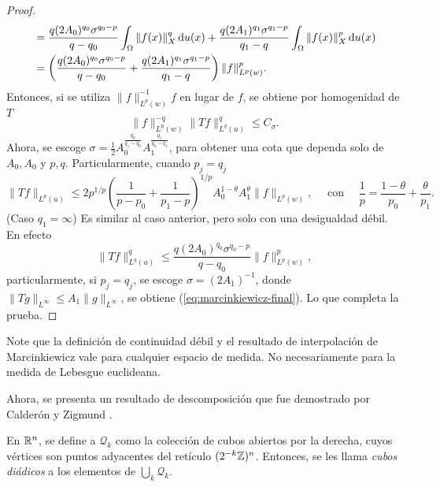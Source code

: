 \begin{proof}
\begin{align*}
		& = \frac{q(2A_0)^{q_0}\sigma^{q_0-p}}{q-q_0} \int_\Omega \|f(x)\|_X^q \mathop{}\!\mathrm{d} u(x) + \frac{q(2A_1)^{q_1}\sigma^{q_1-p}}{q_1-q} \int_\Omega \|f(x)\|_X^p \mathop{}\!\mathrm{d} u(x) \\
		& = \left(\frac{q(2A_0)^{q_0}\sigma^{q_0-p}}{q-q_0} +\frac{q(2A_1)^{q_1}\sigma^{q_1-p}}{q_1-q} \right) \|f\|_{L^p(w)}^p.
	\end{align*}
	Entonces, si se utiliza $\|f\|_{L^p(w)}^{-1} f$ en lugar de $f$, se obtiene por homogenidad de $T$ 
	\begin{equation*}
	\|f\|_{L^p(w)}^{-q}	\|Tf\|_{L^q(u)}^q \leq C_\sigma.
	\end{equation*}
	Ahora, se escoge $\sigma=\frac{1}{2}A_0^{\frac{q_0}{q_1-q_0}}A_1^{\frac{q_1}{q_0-q_1}}$, para obtener una cota que dependa solo de $A_0,A_0$ y $p,q$. Particularmente, cuando $p_j =q_j$
	\begin{equation}\label{eq:marcinkiewicz-final}
		\|Tf\|_{L^p(u)} \leq 2p^{1/p}\left(\frac{1}{p-p_0}+\frac{1}{p_1-p}\right)^{1/p}A_0^{1-\theta}A_1^\theta\|f\|_{L^p(w)}, \quad \text{ con }\quad \frac{1}{p} = \frac{1-\theta}{p_0} + \frac{\theta}{p_1}.
	\end{equation}
	(Caso $q_1=\infty$) Es similar al caso anterior, pero solo con una desigualdad débil. En efecto 
	\begin{equation*}
		\|Tf\|_{L^q(u)}^q \leq \frac{q(2A_0)^{q_0}\sigma^{q_0-p}}{q-q_0} \|f\|_{L^p(w)}^p,
	\end{equation*}
	particularmente, si $p_j=q_j$, se escoge $\sigma = (2A_1)^{-1}$, donde $\|Tg\|_{L^\infty}\leq A_1\|g\|_{L^\infty}$, se obtiene (\ref{eq:marcinkiewicz-final}). Lo que completa la prueba.
\end{proof}
\begin{remark}
	Note que la definición de continuidad débil y el resultado de interpolación de Marcinkiewicz vale para cualquier espacio de medida. No necesariamente para la medida de Lebesgue euclideana.
\end{remark}
Ahora, se presenta un resultado de descomposición que fue demostrado por Calderón y Zigmund \cite{calderon-zygmund}.
\begin{definition}
	En $\mathbb{R}^n$, se define a $\mathcal{Q}_k$ como la colección de cubos abiertos por la derecha, cuyos vértices son puntos adyacentes del retículo $(2^{-k}\mathbb{Z})^n$. Entonces, se les llama \textit{cubos diádicos} a los elementos de $\bigcup_k \mathcal{Q}_k$.
\end{definition}
